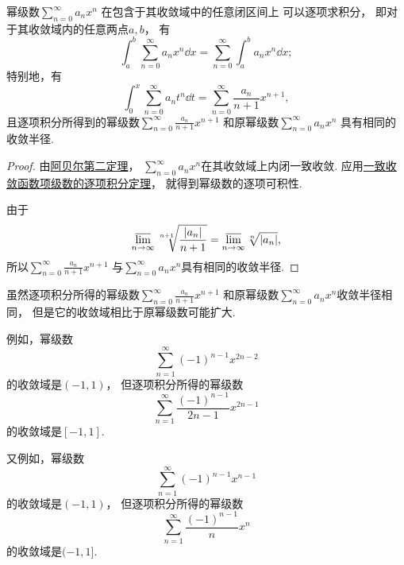 \begin{property}\label{theorem:无穷级数.幂级数的和函数的性质2}
幂级数\(\sum_{n=0}^\infty a_n x^n\)
在包含于其收敛域中的任意闭区间上
可以逐项求积分，
即对于其收敛域内的任意两点\(a,b\)，
有\begin{equation}
	\int_a^b \sum_{n=0}^\infty a_n x^n \dd{x}
	= \sum_{n=0}^\infty \int_a^b a_n x^n \dd{x};
\end{equation}
特别地，有\begin{equation}
	\int_0^x \sum_{n=0}^\infty a_n t^n \dd{t}
	= \sum_{n=0}^\infty \frac{a_n}{n+1} x^{n+1},
\end{equation}
且逐项积分所得到的幂级数\(\sum_{n=0}^\infty \frac{a_n}{n+1} x^{n+1}\)
和原幂级数\(\sum_{n=0}^\infty a_n x^n\)
具有相同的收敛半径.
\begin{proof}
由\hyperref[theorem:无穷级数.阿贝尔定理2]{阿贝尔第二定理}，
\(\sum_{n=0}^\infty a_n x^n\)在其收敛域上内闭一致收敛.
应用\hyperref[theorem:函数项级数.连续函数项级数的一致收敛性保证和函数的可积性]{一致收敛函数项级数的逐项积分定理}，
就得到幂级数的逐项可积性.

由于\[
	\varlimsup_{n\to\infty} \sqrt[n+1]{\frac{\abs{a_n}}{n+1}}
	= \varlimsup_{n\to\infty} \sqrt[n]{\abs{a_n}},
\]
所以\(\sum_{n=0}^\infty \frac{a_n}{n+1} x^{n+1}\)
与\(\sum_{n=0}^\infty a_n x^n\)具有相同的收敛半径.
\end{proof}
\end{property}
\begin{remark}
虽然逐项积分所得的幂级数\(\sum_{n=0}^\infty \frac{a_n}{n+1} x^{n+1}\)
和原幂级数\(\sum_{n=0}^\infty a_n x^n\)收敛半径相同，
但是它的收敛域相比于原幂级数可能扩大.

例如，幂级数\[
	\sum_{n=1}^\infty (-1)^{n-1} x^{2n-2}
\]的收敛域是\((-1,1)\)，
但逐项积分所得的幂级数\[
	\sum_{n=1}^\infty \frac{(-1)^{n-1}}{2n-1} x^{2n-1}
\]的收敛域是\([-1,1]\).

又例如，幂级数\[
	\sum_{n=1}^\infty (-1)^{n-1} x^{n-1}
\]的收敛域是\((-1,1)\)，
但逐项积分所得的幂级数\[
	\sum_{n=1}^\infty \frac{(-1)^{n-1}}{n} x^n
\]的收敛域是\((-1,1]\).
\end{remark}

